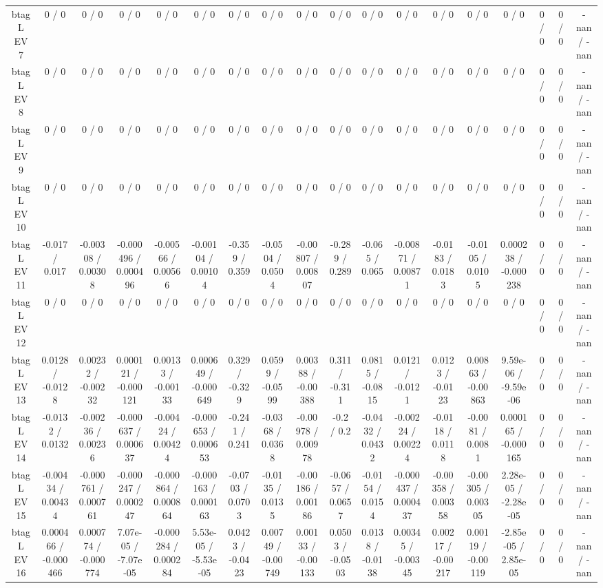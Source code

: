 \documentclass[10pt]{article}
\begin{document}
\begin{table}[htbp]
\begin{center}
\begin{tabular}{|c|c|c|c|c|c|c|c|c|c|c|c|c|c|c|c|c|c|}
  btag L EV 7 & 0 / 0 & 0 / 0 & 0 / 0 & 0 / 0 & 0 / 0 & 0 / 0 & 0 / 0 & 0 / 0 & 0 / 0 & 0 / 0 & 0 / 0 & 0 / 0 & 0 / 0 & 0 / 0 & 0 / 0 & 0 / 0 & -nan / -nan \\ 
  btag L EV 8 & 0 / 0 & 0 / 0 & 0 / 0 & 0 / 0 & 0 / 0 & 0 / 0 & 0 / 0 & 0 / 0 & 0 / 0 & 0 / 0 & 0 / 0 & 0 / 0 & 0 / 0 & 0 / 0 & 0 / 0 & 0 / 0 & -nan / -nan \\ 
  btag L EV 9 & 0 / 0 & 0 / 0 & 0 / 0 & 0 / 0 & 0 / 0 & 0 / 0 & 0 / 0 & 0 / 0 & 0 / 0 & 0 / 0 & 0 / 0 & 0 / 0 & 0 / 0 & 0 / 0 & 0 / 0 & 0 / 0 & -nan / -nan \\ 
  btag L EV 10 & 0 / 0 & 0 / 0 & 0 / 0 & 0 / 0 & 0 / 0 & 0 / 0 & 0 / 0 & 0 / 0 & 0 / 0 & 0 / 0 & 0 / 0 & 0 / 0 & 0 / 0 & 0 / 0 & 0 / 0 & 0 / 0 & -nan / -nan \\ 
  btag L EV 11 & -0.017 / 0.017 & -0.00308 / 0.00308 & -0.000496 / 0.000496 & -0.00566 / 0.00566 & -0.00104 / 0.00104 & -0.359 / 0.359 & -0.0504 / 0.0504 & -0.00807 / 0.00807 & -0.289 / 0.289 & -0.065 / 0.065 & -0.00871 / 0.00871 & -0.0183 / 0.0183 & -0.0105 / 0.0105 & 0.000238 / -0.000238 & 0 / 0 & 0 / 0 & -nan / -nan \\ 
  btag L EV 12 & 0 / 0 & 0 / 0 & 0 / 0 & 0 / 0 & 0 / 0 & 0 / 0 & 0 / 0 & 0 / 0 & 0 / 0 & 0 / 0 & 0 / 0 & 0 / 0 & 0 / 0 & 0 / 0 & 0 / 0 & 0 / 0 & -nan / -nan \\ 
  btag L EV 13 & 0.0128 / -0.0128 & 0.00232 / -0.00232 & 0.000121 / -0.000121 & 0.00133 / -0.00133 & 0.000649 / -0.000649 & 0.329 / -0.329 & 0.0599 / -0.0599 & 0.00388 / -0.00388 & 0.311 / -0.311 & 0.0815 / -0.0815 & 0.0121 / -0.0121 & 0.0123 / -0.0123 & 0.00863 / -0.00863 & 9.59e-06 / -9.59e-06 & 0 / 0 & 0 / 0 & -nan / -nan \\ 
  btag L EV 14 & -0.0132 / 0.0132 & -0.00236 / 0.00236 & -0.000637 / 0.000637 & -0.00424 / 0.00424 & -0.000653 / 0.000653 & -0.241 / 0.241 & -0.0368 / 0.0368 & -0.00978 / 0.00978 & -0.2 / 0.2 & -0.0432 / 0.0432 & -0.00224 / 0.00224 & -0.0118 / 0.0118 & -0.0081 / 0.0081 & 0.000165 / -0.000165 & 0 / 0 & 0 / 0 & -nan / -nan \\ 
  btag L EV 15 & -0.00434 / 0.00434 & -0.000761 / 0.000761 & -0.000247 / 0.000247 & -0.000864 / 0.000864 & -0.000163 / 0.000163 & -0.0703 / 0.0703 & -0.0135 / 0.0135 & -0.00186 / 0.00186 & -0.0657 / 0.0657 & -0.0154 / 0.0154 & -0.000437 / 0.000437 & -0.00358 / 0.00358 & -0.00305 / 0.00305 & 2.28e-05 / -2.28e-05 & 0 / 0 & 0 / 0 & -nan / -nan \\ 
  btag L EV 16 & 0.000466 / -0.000466 & 0.000774 / -0.000774 & 7.07e-05 / -7.07e-05 & -0.000284 / 0.000284 & 5.53e-05 / -5.53e-05 & 0.0423 / -0.0423 & 0.00749 / -0.00749 & 0.00133 / -0.00133 & 0.0503 / -0.0503 & 0.0138 / -0.0138 & 0.00345 / -0.00345 & 0.00217 / -0.00217 & 0.00119 / -0.00119 & -2.85e-05 / 2.85e-05 & 0 / 0 & 0 / 0 & -nan / -nan \\ 

\end{tabular}
\end{center}
\end{table}
\end{document}
